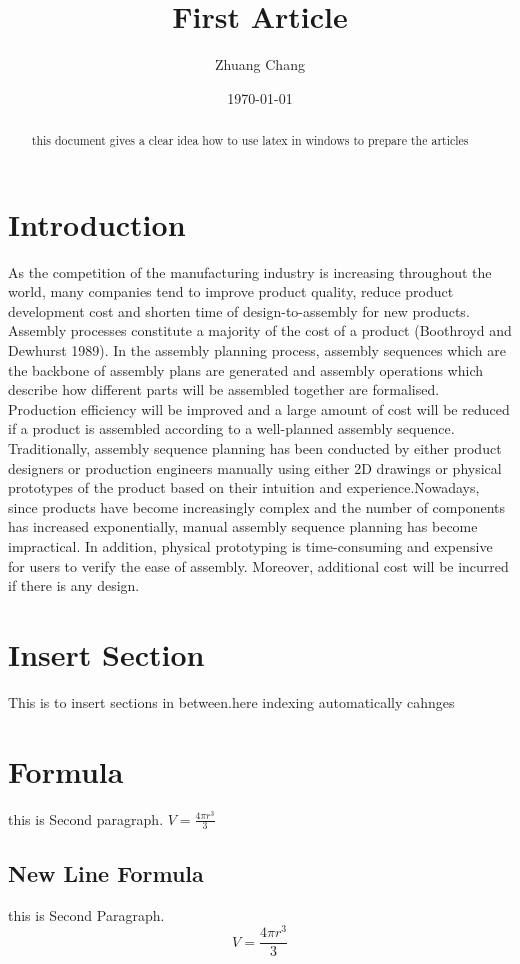 \documentclass{article}
\begin{document}
\title{First Article}
\author{Zhuang Chang}
\date{\today}
\maketitle
\begin{abstract}
this document gives a clear idea how to use latex in windows 
to prepare the articles
\end{abstract}
\tableofcontents

\section{Introduction}
As the competition of the manufacturing industry
 is increasing throughout the world, many companies tend to 
improve product quality, reduce product development cost and shorten 
time of design-to-assembly for new products. Assembly processes constitute 
a majority of the cost of a product (Boothroyd and Dewhurst 1989). In the assembly planning process, assembly sequences which are the backbone of assembly plans are generated and assembly operations which describe how different parts will be assembled together are formalised. Production efficiency will be improved and a large amount of cost will be reduced if a product is assembled according to a well-planned assembly sequence.
Traditionally, assembly sequence planning has been conducted by either product designers or production engineers manually using either 2D drawings or physical prototypes of the product based on their intuition and experience.Nowadays, since products have become increasingly complex and the number of components has increased exponentially, manual assembly sequence planning has become impractical. In addition, physical prototyping is time-consuming and expensive for users to verify the ease of assembly. Moreover, additional cost will be incurred if there is any design.
\section{Insert Section}
This is to insert sections in between.here indexing automatically cahnges

\section{Formula}
this is Second paragraph.
$ V = \frac{4 \pi r^3}{3} $
\subsection{New Line Formula}
this is Second Paragraph.
$$ V = \frac{4 \pi r^3}{3} $$
\end{document}
